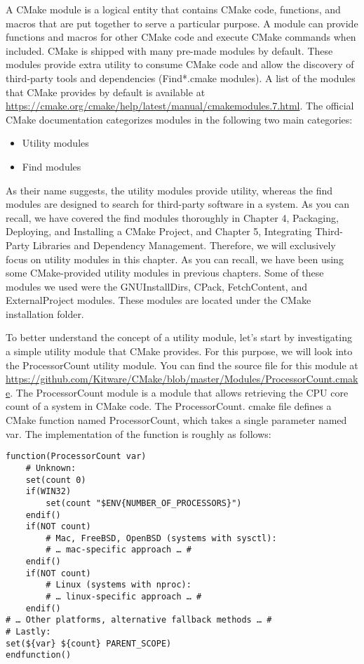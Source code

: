 A CMake module is a logical entity that contains CMake code, functions, and macros that are put together to serve a particular purpose. A module can provide functions and macros for other CMake code and execute CMake commands when included. CMake is shipped with many pre-made modules by default. These modules provide extra utility to consume CMake code and allow the discovery of third-party tools and dependencies (Find*.cmake modules). A list of the modules that CMake provides by default is available at \url{https://cmake.org/cmake/help/latest/manual/cmakemodules.7.html}. The official CMake documentation categorizes modules in the following two main categories:

\begin{itemize}
\item 
Utility modules

\item 
Find modules
\end{itemize}

As their name suggests, the utility modules provide utility, whereas the find modules are designed to search for third-party software in a system. As you can recall, we have covered the find modules thoroughly in Chapter 4, Packaging, Deploying, and Installing a CMake Project, and Chapter 5, Integrating Third-Party Libraries and Dependency Management. Therefore, we will exclusively focus on utility modules in this chapter. As you can recall, we have been using some CMake-provided utility modules in previous chapters. Some of these modules we used were the GNUInstallDirs, CPack, FetchContent, and ExternalProject modules. These modules are located under the CMake installation folder.

To better understand the concept of a utility module, let's start by investigating a simple utility module that CMake provides. For this purpose, we will look into the ProcessorCount utility module. You can find the source file for this module at \url{https://github.com/Kitware/CMake/blob/master/Modules/ProcessorCount.cmake}. The ProcessorCount module is a module that allows retrieving the CPU core count of a system in CMake code. The ProcessorCount. cmake file defines a CMake function named ProcessorCount, which takes a single parameter named var. The implementation of the function is roughly as follows:

\begin{lstlisting}[style=styleCMake]
function(ProcessorCount var)
	# Unknown:
	set(count 0)
	if(WIN32)
		set(count "$ENV{NUMBER_OF_PROCESSORS}")
	endif()
	if(NOT count)
		# Mac, FreeBSD, OpenBSD (systems with sysctl):
		# … mac-specific approach … #
	endif()
	if(NOT count)
		# Linux (systems with nproc):
		# … linux-specific approach … #
	endif()
# … Other platforms, alternative fallback methods … #
# Lastly:
set(${var} ${count} PARENT_SCOPE)
endfunction()
\end{lstlisting}

